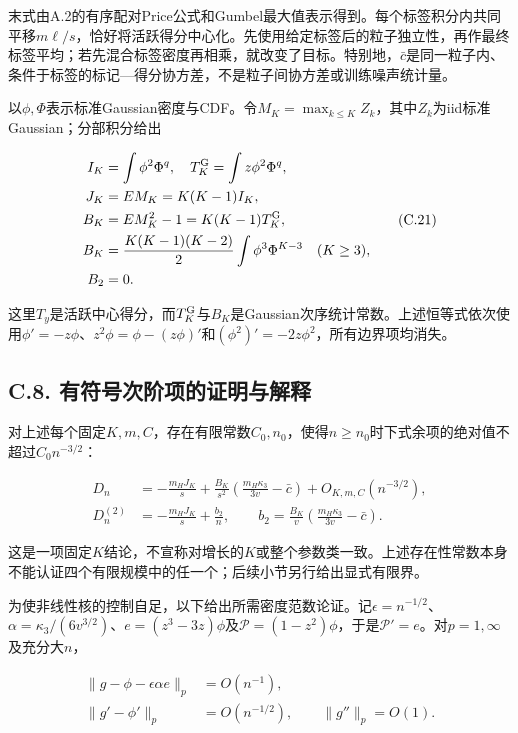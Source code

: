 \documentclass[11pt,a4paper]{article}
\begin{document}
末式由A.2的有序配对Price公式和Gumbel最大值表示得到。每个标签积分内共同平移\(m\ell/s\)，恰好将活跃得分中心化。先使用给定标签后的粒子独立性，再作最终标签平均；若先混合标签密度再相乘，就改变了目标。特别地，\(\bar c\)是同一粒子内、条件于标签的标记---得分协方差，不是粒子间协方差或训练噪声统计量。

以\(\phi,\Phi\)表示标准Gaussian密度与CDF。令\(M_K=\max_{k\le K}Z_k\)，其中\(Z_k\)为iid标准Gaussian；分部积分给出

\[
\begin{aligned}
I_K&=\int\phi^2\Phi^q,\quad T_K^{\rm G}=\int z\phi^2\Phi^q,\\
J_K&=EM_K=K(K-1)I_K,\\
B_K&=EM_K^2-1=K(K-1)T_K^{\rm G},\\
B_K&=\frac{K(K-1)(K-2)}2\int\phi^3\Phi^{K-3}\quad(K\ge3),\\
B_2&=0.
\end{aligned}
\tag{C.21}
\]

这里\(T_y\)是活跃中心得分，而\(T_K^{\rm G}\)与\(B_K\)是Gaussian次序统计常数。上述恒等式依次使用\(\phi'=-z\phi\)、\(z^2\phi=\phi-(z\phi)'\)和\((\phi^2)'=-2z\phi^2\)，所有边界项均消失。

\subsection*{C.8.
有符号次阶项的证明与解释}\label{c.8.-ux6709ux7b26ux53f7ux6b21ux9636ux9879ux7684ux8bc1ux660eux4e0eux89e3ux91ca}

对上述每个固定\(K,m,C\)，存在有限常数\(C_0,n_0\)，使得\(n\ge n_0\)时下式余项的绝对值不超过\(C_0n^{-3/2}\)：

\[
\begin{aligned}
D_n&=-\frac{m_HJ_K}{s}
+\frac{B_K}{s^2}\left(\frac{m_H\kappa_3}{3v}-\bar c\right)
+O_{K,m,C}(n^{-3/2}),\\
D_n^{(2)}&=-\frac{m_HJ_K}{s}+\frac{b_2}{n},\qquad
b_2=\frac{B_K}{v}\left(\frac{m_H\kappa_3}{3v}-\bar c\right).
\end{aligned}
\tag{C.22}
\]

这是一项固定\(K\)结论，不宣称对增长的\(K\)或整个参数类一致。上述存在性常数本身不能认证四个有限规模中的任一个；后续小节另行给出显式有限界。

为使非线性核的控制自足，以下给出所需密度范数论证。记\(\epsilon=n^{-1/2}\)、\(\alpha=\kappa_3/(6v^{3/2})\)、\(e=(z^3-3z)\phi\)及\(\mathcal P=(1-z^2)\phi\)，于是\(\mathcal P'=e\)。对\(p=1,\infty\)及充分大\(n\)，

\[
\begin{aligned}
\|g-\phi-\epsilon\alpha e\|_p&=O(n^{-1}),\\
\|g'-\phi'\|_p&=O(n^{-1/2}),\qquad \|g''\|_p=O(1).
\end{aligned}
\tag{C.23}
\]
\end{document}
